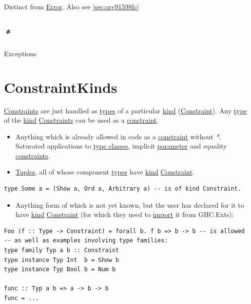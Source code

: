 \documentclass[a4paper,14pt,oneside]{book}
\begin{document}
Distinct from \hyperref[org5aafd30]{Error}. Also see \ref{sec:org91598fc}

\section{\emph{*}}
\label{sec:org827e7a6}

\label{org644907c}Exceptions

\chapter{\label{orgd46a3fe}ConstraintKinds}
\label{sec:orgf353161}
\hyperref[orgb078cc8]{Constraints} are just handled as \hyperref[org429969d]{types} of a particular \hyperref[org741b742]{kind} (\hyperref[org894d760]{Constraint}).
Any \hyperref[org7bdd7ea]{type} of the \hyperref[org741b742]{kind} \hyperref[orgb078cc8]{Constraints} can be used as a \hyperref[org894d760]{constraint}.
\begin{itemize}
\item Anything which is already allowed in code as a \hyperref[org894d760]{constraint} without \emph{*}. Saturated applications to \hyperref[orgf9db3ea]{type classes}, implicit \hyperref[orgd01c7e0]{parameter} and equality \hyperref[orgb078cc8]{constraints}.
\item \hyperref[orgdbfd16f]{Tuples}, all of whose component \hyperref[org429969d]{types} have \hyperref[org741b742]{kind} \hyperref[org894d760]{Constraint}.
\end{itemize}
\begin{verbatim}
type Some a = (Show a, Ord a, Arbitrary a) -- is of kind Constraint.
\end{verbatim}
\begin{itemize}
\item Anything form of which is not yet known, but the user has declared for it to have \hyperref[org741b742]{kind} \hyperref[org894d760]{Constraint} (for which they need to \hyperref[orgcd213b2]{import} it from GHC.Exts):
\end{itemize}
\begin{verbatim}
Foo (f :: Type -> Constraint) = forall b. f b => b -> b -- is allowed
-- as well as examples involving type families:
type family Typ a b :: Constraint
type instance Typ Int  b = Show b
type instance Typ Bool b = Num b

func :: Typ a b => a -> b -> b
func = ...
\end{verbatim}
\end{document}
